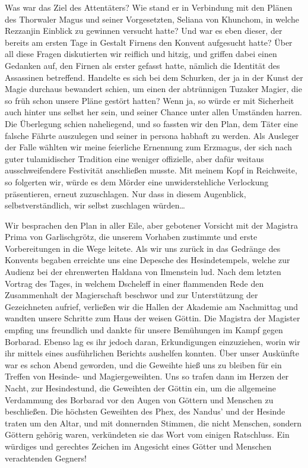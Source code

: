 Was war das Ziel des Attentäters? Wie stand er in Verbindung mit den Plänen des Thorwaler Magus und seiner Vorgesetzten, Seliana von Khunchom, in welche Rezzanjin Einblick zu gewinnen versucht hatte? Und war es eben dieser, der bereits am ersten Tage in Gestalt Firnens den Konvent aufgesucht hatte? Über all diese Fragen diskutierten wir reiflich und hitzig, und griffen dabei einen Gedanken auf, den Firnen als erster gefasst hatte, nämlich die Identität des Assassinen betreffend. Handelte es sich bei dem Schurken, der ja in der Kunst der Magie durchaus bewandert schien, um einen der abtrünnigen Tuzaker Magier, die so früh schon unsere Pläne gestört hatten? Wenn ja, so würde er mit Sicherheit auch hinter uns selbst her sein, und seiner Chance unter allen Umständen harren. Die Überlegung schien naheliegend, und so fassten wir den Plan, dem Täter eine falsche Fährte auszulegen und seiner in persona habhaft zu werden. Als Ausleger der Falle wählten wir meine feierliche Ernennung zum Erzmagus, der sich nach guter tulamidischer Tradition eine weniger offizielle, aber dafür weitaus ausschweifendere Festivität anschließen musste. Mit meinem Kopf in Reichweite, so folgerten wir, würde es dem Mörder eine unwiderstehliche Verlockung präsentieren, erneut zuzuschlagen. Nur dass in diesem Augenblick, selbstverständlich, wir selbst zuschlagen würden\dots

Wir besprachen den Plan in aller Eile, aber gebotener Vorsicht mit der Magistra Prima von Garlischgrötz, die unserem Vorhaben zustimmte und erste Vorbereitungen in die Wege leitete. Als wir uns zurück in das Gedränge des Konvents begaben erreichte uns eine Depesche des Hesindetempels, welche zur Audienz bei der ehrenwerten Haldana von Ilmenstein lud. Nach dem letzten Vortrag des Tages, in welchem Dscheleff in einer flammenden Rede den Zusammenhalt der Magierschaft beschwor und zur Unterstützung der Gezeichneten aufrief, verließen wir die Hallen der Akademie am Nachmittag und wandten unsere Schritte zum Haus der weisen Göttin. Die Magistra der Magister empfing uns freundlich und dankte für unsere Bemühungen im Kampf gegen Borbarad. Ebenso lag es ihr jedoch daran, Erkundigungen einzuziehen, worin wir ihr mittels eines ausführlichen Berichts aushelfen konnten. Über unser Auskünfte war es schon Abend geworden, und die Geweihte hieß uns zu bleiben für ein Treffen von Hesinde- und Magiergeweihten. Uns so trafen dann im Herzen der Nacht, zur Hesindestund, die Geweihten der Göttin ein, um die allgemeine Verdammung des Borbarad vor den Augen von Göttern und Menschen zu beschließen. Die höchsten Geweihten des Phex, des Nandus' und der Hesinde traten um den Altar, und mit donnernden Stimmen, die nicht Menschen, sondern Göttern gehörig waren, verkündeten sie das Wort vom einigen Ratschluss. Ein würdiges und gerechtes Zeichen im Angesicht eines Götter und Menschen verachtenden Gegners!

